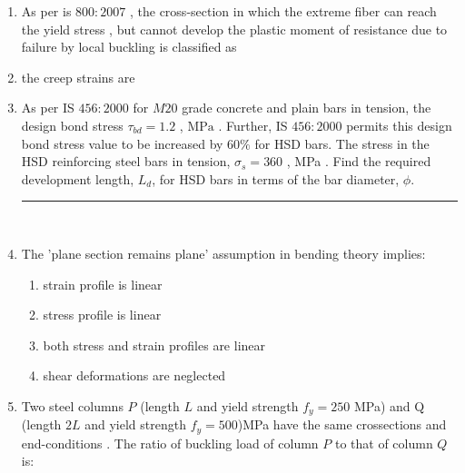\documentclass[journal]{IEEEtran}
\begin{document}
\begin{enumerate}
\begin{enumerate}
\end{enumerate}
\item As per is $800:2007$ , the cross-section in which the extreme fiber can reach the yield stress , but cannot develop the plastic moment of resistance due to failure by local buckling is classified as
\begin{enumerate}
\end{enumerate}
\item the creep strains are 
\begin{enumerate}
\end{enumerate}
\item As per IS $456:2000$ for $M20$ grade concrete and plain bars in tension, the design bond stress $\tau_{bd} = 1.2 $ , $\text{MPa}$ . Further, IS $456:2000$ permits this design bond stress value to be increased by $60\%$ for HSD bars. The stress in the HSD reinforcing steel bars in tension, $\sigma_s = 360$ , MPa . Find the required development length, $L_d$, for HSD bars in terms of the bar diameter, $\phi$. \rule{2cm}{0.4pt} \\
\item The 'plane section remains plane' assumption in bending theory implies: 
\begin{enumerate}
\item strain profile is linear 
\item stress profile is linear
\item both stress and strain profiles are linear 
\item shear deformations are neglected
\end{enumerate}
\item Two steel columns $P$ (length $L$ and yield strength $f_y = 250$ MPa) and Q (length $2L$ and yield strength $f_y = 500$)MPa have the same crossections and end-conditions . The ratio of buckling load of column $P$ to that of column $Q$ is: 

\end{enumerate}
\end{document}
